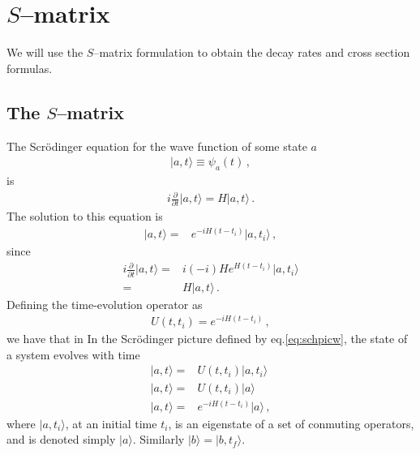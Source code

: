 \chapter{$S$--matrix}
\label{cha:s-matrix} %


We will use the $S$--matrix formulation to obtain the decay rates and cross section formulas. 

\section{The $S$--matrix}
\label{sec:s-matrix}
The Scr\"odinger equation for the wave function of some state $a$
\begin{align}
  |a,t\rangle\equiv\psi_a(t)\,,
\end{align}
is
\begin{align}
i\frac{\partial}{\partial t}|a,t\rangle=H|a,t\rangle\,.
\end{align}
The solution to this equation is
\begin{align}
  \label{eq:schpicw}
   |a,t\rangle=&e^{-i H(t-t_i)}|a,t_i\rangle\,,
\end{align}
since
\begin{align}
  i\frac{\partial}{\partial t}|a,t\rangle=&i(-i)H e^{H(t-t_i)}|a,t_i\rangle\nonumber\\
=&H |a,t\rangle\,.
\end{align}
Defining the time-evolution operator as
\begin{align}
  U(t,t_i)=e^{-i H(t-t_i)}\,,
\end{align}
we have that in In the Scr\"odinger picture defined by
eq.\eqref{eq:schpicw}, the state of a system evolves with time
\begin{align}
\label{eq:39}
  |a,t\rangle=&U(t,t_i)|a,t_i\rangle\nonumber\\
  |a,t\rangle=&U(t,t_i)|a\rangle\nonumber\\
  |a,t\rangle=&e^{-i H(t-t_i)}|a\rangle\,,
\end{align}
where $|a,t_i\rangle$, at an initial time $t_i$, is an eigenstate of a set of conmuting operators, and is denoted simply $|a\rangle$. Similarly $|b\rangle=|b,t_f\rangle$.

